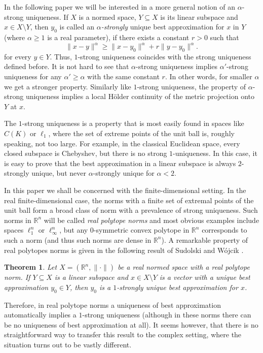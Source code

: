\documentclass[12pt, reqno]{amsart}
\newtheorem{twr}{Theorem}[section]
\theoremstyle{definition}
\theoremstyle{remark}
\numberwithin{equation}{section}
\begin{document}
In the following paper we will be interested in a more general notion of an $\alpha$-strong uniqueness. If $X$ is a normed space, $Y \subseteq X$ is its linear subspace and $x \in X \setminus Y$, then $y_0$ is called an \emph{$\alpha$-strongly} unique best approximation for $x$ in $Y$ (where $\alpha \geq 1$ is a real parameter), if there exists a constant $r>0$ such that
$$\|x-y\|^{\alpha} \geq \|x-y_0\|^{\alpha} + r\|y-y_0\|^{\alpha}.$$
for every $y \in Y$. Thus, $1$-strong uniqueness coincides with the strong uniqueness defined before. It is not hard to see that $\alpha$-strong uniqueness implies $\alpha'$-strong uniqueness for any $\alpha' \geq \alpha$ with the same constant $r$. In other words, for smaller $\alpha$ we get a stronger property. Similarly like $1$-strong uniqueness, the property of $\alpha$-strong uniqueness implies a local H\"older continuity of the metric projection onto $Y$ at $x$.

The $1$-strong uniqueness is a property that is most easily found in spaces like $C(K)$ or $\ell_1$, where the set of extreme points of the unit ball is, roughly speaking, not too large. For example, in the classical Euclidean space, every closed subspace is Chebyshev, but there is no strong $1$-uniqueness. In this case, it is easy to prove that the best approximation in a linear subspace is always $2$-strongly unique, but never $\alpha$-strongly unique for $\alpha<2$.

In this paper we shall be concerned with the finite-dimensional setting. In the real finite-dimensional case, the norms with a finite set of extremal points of the unit ball form a broad class of norm with a prevalence of strong uniqueness. Such norms in $\mathbb{R}^n$ will be called \emph{real polytope norms} and most obvious examples include spaces $\ell_1^n$ or $\ell_{\infty}^n$, but any $0$-symmetric convex polytope in $\mathbb{R}^n$ corresponds to such a norm (and thus such norms are dense in $\mathbb{R}^n$). A remarkable property of real polytopes norms is given in the following result of Sudolski and Wójcik \cite{sudolski}.


\begin{twr}
\label{twrsudolskiwojcik}
Let $X = (\mathbb{R}^n, \| \cdot \|)$ be a real normed space with a real polytope norm. If $Y \subseteq X$ is a linear subspace and $x \in X \setminus Y$ is a vector with a unique best approximation $y_0 \in Y$, then $y_0$ is a $1$-strongly unique best approximation for $x$.
\end{twr}

Therefore, in real polytope norms a uniqueness of best approximation automatically implies a $1$-strong uniqueness (although in these norms there can be no uniqueness of best approximation at all). It seems however, that there is no straightforward way to transfer this result to the complex setting, where the situation turns out to be vastly different.
\end{document}
